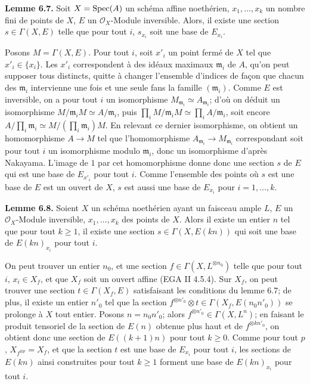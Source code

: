\textbf{Lemme 6.7.} Soit $X=\operatorname{Spec}(A)$ un schéma affine noethérien, $x_1,\ldots,x_k$ un nombre fini de points de $X$, $E$ un $\mathcal O_X$-Module inversible. Alors, il existe une section $s\in\Gamma(X,E)$ telle que pour tout $i$, $s_{x_i}$ soit une base de $E_{x_i}$.

Posons $M=\Gamma(X,E)$. Pour tout $i$, soit $x'_i$ un point fermé de $X$ tel que $x'_i\in\{x_i\}$. Les $x'_i$ correspondent à des idéaux maximaux $\mathfrak m_i$ de $A$, qu'on peut supposer tous distincts, quitte à changer l'ensemble d'indices de façon que chacun des $\mathfrak m_i$ intervienne une fois et une seule fans la famille $(\mathfrak m_i)$. Comme $E$ est inversible, on a pour tout $i$ un isomorphisme $M_{\mathfrak m_i}\simeq A_{\mathfrak m_i}$; d'où on déduit un isomorphisme $M/\mathfrak m_iM\simeq A/\mathfrak m_i$, puis $\prod_i M/\mathfrak m_iM\simeq\prod_i A/\mathfrak m_i$, soit encore $A/\prod_i\mathfrak m_i\simeq M/(\prod_i\mathfrak m_i)M$. En relevant ce dernier isomorphisme, on obtient un homomorphisme $A\to M$ tel que l'homomorphisme $A_{\mathfrak m_i}\to M_{\mathfrak m_i}$ correspondant soit pour tout $i$ un isomorphisme modulo $\mathfrak m_i$, donc un isomorphisme d'après Nakayama. L'image de $1$ par cet homomorphisme donne donc une section $s$ de $E$ qui est une base de $E_{x'_i}$ pour tout $i$. Comme l'ensemble des points où $s$ est une base de $E$ est un ouvert de $X$, $s$ est aussi une base de $E_{x_i}$ pour $i=1,\ldots,k$.

\textbf{Lemme 6.8.} Soient $X$ un schéma noethérien ayant un faisceau ample $L$, $E$ un $\mathcal O_X$-Module inversible, $x_1,\ldots,x_k$ des points de $X$. Alors il existe un
entier $n$ tel que pour tout $k\ge1$, il existe une section $s\in\Gamma(X,E(kn))$ qui soit une base de $E(kn)_{x_i}$ pour tout $i$.

On peut trouver un entier $n_0$, et une section $f\in\Gamma(X,L^{\otimes n_0})$ telle que pour tout $i$, $x_i\in X_f$, et que $X_f$ soit un ouvert affine (EGA II 4.5.4). Sur $X_f$, on peut trouver une section $t\in\Gamma(X_f,E)$ satisfaisant les conditions du lemme 6.7; de plus, il existe un entier $n'_0$ tel que la section $f^{\otimes n'_0}\otimes t\in\Gamma(X_f,E(n_0n'_0))$ se prolonge à $X$ tout entier. Posons $n=n_0n'_0$; alors $f^{\otimes n'_0}\in\Gamma(X,L^n)$; en faisant le produit tensoriel de la section de $E(n)$ obtenue plus haut et de $f^{\otimes kn'_0}$, on obtient donc une section de $E((k+1)n)$ pour tout $k\ge0$. Comme pour tout $p$, $X_{f^{\otimes p}}=X_f$, et que la section $t$ est une base de $E_{x_i}$ pour tout $i$, les sections de $E(kn)$ ainsi construites pour tout $k\ge1$ forment une base de $E(kn)_{x_i}$ pour tout $i$.


